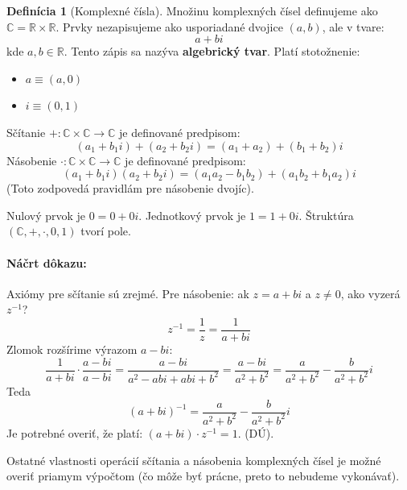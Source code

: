 \documentclass[11pt,a4paper]{article}
\theoremstyle{definition}
\newtheorem{definicia}{Definícia}[section]
\theoremstyle{plain}
\theoremstyle{remark}
\newcommand{\R}{\mathbb{R}}
\begin{document}
\begin{definicia}[Komplexné čísla]
Množinu komplexných čísel definujeme ako $\mathbb{C} = \R \times \R$. Prvky nezapisujeme ako usporiadané dvojice $(a, b)$, ale v tvare:
\[ a + bi \]
kde $a, b \in \R$. Tento zápis sa nazýva \textbf{algebrický tvar}.
Platí stotožnenie:
\begin{itemize}
    \item $a \equiv (a, 0)$
    \item $i \equiv (0, 1)$
\end{itemize}
Sčítanie $+: \mathbb{C} \times \mathbb{C} \to \mathbb{C}$ je definované predpisom:
\[ (a_1 + b_1 i) + (a_2 + b_2 i) = (a_1 + a_2) + (b_1 + b_2)i \]
Násobenie $\cdot: \mathbb{C} \times \mathbb{C} \to \mathbb{C}$ je definované predpisom:
\[ (a_1 + b_1 i)(a_2 + b_2 i) = (a_1 a_2 - b_1 b_2) + (a_1 b_2 + b_1 a_2)i \]
(Toto zodpovedá pravidlám pre násobenie dvojíc).
\end{definicia}

Nulový prvok je $0 = 0 + 0i$. Jednotkový prvok je $1 = 1 + 0i$.
Štruktúra $( \mathbb{C}, +, \cdot, 0, 1 )$ tvorí pole.

\paragraph{Náčrt dôkazu:} Axiómy pre sčítanie sú zrejmé. Pre násobenie: ak $z = a+bi$ a $z \neq 0$, ako vyzerá $z^{-1}$?
\[ z^{-1} = \frac{1}{z} = \frac{1}{a+bi} \]
Zlomok rozšírime výrazom $a-bi$:
\[ \frac{1}{a+bi} \cdot \frac{a-bi}{a-bi} = \frac{a-bi}{a^2 - abi + abi + b^2} = \frac{a-bi}{a^2+b^2} = \frac{a}{a^2+b^2} - \frac{b}{a^2+b^2}i \]
Teda
\[ (a+bi)^{-1} = \frac{a}{a^2+b^2} - \frac{b}{a^2+b^2}i \]
Je potrebné overiť, že platí: $(a+bi) \cdot z^{-1} = 1$. (DÚ).

Ostatné vlastnosti operácií sčítania a násobenia komplexných čísel je možné overiť priamym výpočtom (čo môže byť prácne, preto to nebudeme vykonávať).
\end{document}
